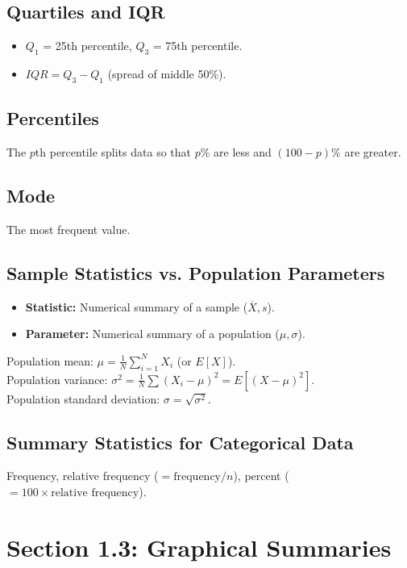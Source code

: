 \documentclass[11pt]{article}
\begin{document}
\subsection*{Quartiles and IQR}
\begin{itemize}[nosep]
    \item \(Q_1\) = 25th percentile, \(Q_3\) = 75th percentile.
    \item \(IQR = Q_3 - Q_1\) (spread of middle 50\%).
\end{itemize}

\subsection*{Percentiles}
The \(p\)th percentile splits data so that \(p\%\) are less and \((100-p)\%\) are greater.

\subsection*{Mode}
The most frequent value.

\subsection*{Sample Statistics vs. Population Parameters}
\begin{itemize}[nosep]
    \item \textbf{Statistic:} Numerical summary of a sample (\(\overline{X}, s\)).
    \item \textbf{Parameter:} Numerical summary of a population (\(\mu, \sigma\)).
\end{itemize}

Population mean: \(\mu = \frac{1}{N}\sum_{i=1}^{N} X_i\) (or \(E[X]\)).\\
Population variance: \(\sigma^2 = \frac{1}{N}\sum (X_i-\mu)^2 = E[(X-\mu)^2]\).\\
Population standard deviation: \(\sigma = \sqrt{\sigma^2}\).

\subsection*{Summary Statistics for Categorical Data}
Frequency, relative frequency (\(=\text{frequency}/n\)), percent (\(=100\times\text{relative frequency}\)).

\section*{Section 1.3: Graphical Summaries}
\end{document}
